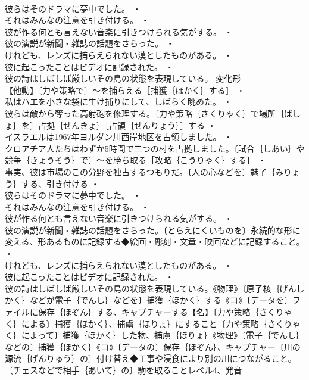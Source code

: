 \documentclass[8pt]{extreport}
\begin{document}
\begin{CJK}{UTF8}{min}
\\	彼らはそのドラマに夢中でした。 ・
\\	それはみんなの注意を引き付ける。 ・
\\	彼が作る何とも言えない音楽に引きつけられる気がする。 ・
\\	彼の演説が新聞・雑誌の話題をさらった。 ・
\\	けれども、レンズに捕らえられない漠としたものがある。 ・
\\	彼に起こったことはビデオに記録された。 ・
\\	彼の詩はしばしば厳しいその島の状態を表現している。	変化形 
\\	【他動】〔力や策略で〕～を捕らえる［捕獲｛ほかく｝する］ ・
\\	私はハエを小さな袋に生け捕りにして、しばらく眺めた。 ・
\\	彼らは敵から奪った高射砲を修理する。〔力や策略｛さくりゃく｝で場所｛ばしょ｝を〕占拠｛せんきょ｝［占領｛せんりょう｝］する ・
\\	イスラエルは1967年ヨルダン川西岸地区を占領しました。 ・
\\	クロアチア人たちはわずか5時間で三つの村を占拠しました。〔試合｛しあい｝や競争｛きょうそう｝で〕～を勝ち取る［攻略｛こうりゃく｝する］ ・
\\	事実、彼は市場のこの分野を独占するつもりだ。〔人の心などを〕魅了｛みりょう｝する、引き付ける ・
\\	彼らはそのドラマに夢中でした。 ・
\\	それはみんなの注意を引き付ける。 ・
\\	彼が作る何とも言えない音楽に引きつけられる気がする。 ・
\\	彼の演説が新聞・雑誌の話題をさらった。〔とらえにくいものを〕永続的な形に変える、形あるものに記録する◆絵画・彫刻・文章・映画などに記録すること。 ・
\\	けれども、レンズに捕らえられない漠としたものがある。 ・
\\	彼に起こったことはビデオに記録された。 ・
\\	彼の詩はしばしば厳しいその島の状態を表現している。《物理》〔原子核｛げんしかく｝などが電子｛でんし｝などを〕捕獲｛ほかく｝する《コ》〔データを〕ファイルに保存｛ほぞん｝する、キャプチャーする【名】〔力や策略｛さくりゃく｝による〕捕獲｛ほかく｝、捕虜｛ほりょ｝にすること〔力や策略｛さくりゃく｝によって〕捕獲｛ほかく｝した物、捕虜｛ほりょ｝《物理》〔電子｛でんし｝などの〕捕獲｛ほかく｝《コ》〔データの〕保存｛ほぞん｝、キャプチャー〔川の源流｛げんりゅう｝の〕付け替え◆工事や浸食により別の川につながること。〔チェスなどで相手｛あいて｝の〕駒を取ることレベル4、発音

\end{CJK}
\end{document}
